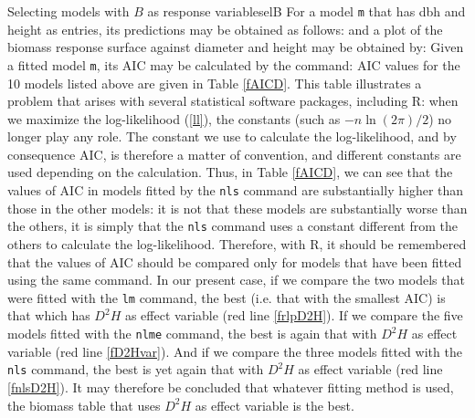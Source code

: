 \begin{filrouge}{Selecting models with $B$ as response variable}{selB}
For a model \texttt{m} that has dbh and height as entries, its predictions may be obtained as follows:
%
and a plot of the biomass response surface against diameter and height may be obtained by:
%
Given a fitted model \texttt{m}, its AIC may be calculated by the command: 
%
AIC values for the 10 models listed above are given in Table \ref{fAICD}. This table illustrates a problem that arises with several statistical software packages, including R: when we maximize the log-likelihood (\ref{ll}), the constants (such as $-n\ln(2\pi)/2$) no longer play any role. The constant we use to calculate the log-likelihood, and by consequence AIC, is therefore a matter of convention, and different constants are used depending on the calculation. Thus, in Table \ref{fAICD}, we can see that the values of AIC in models fitted by the \texttt{nls} command are substantially higher than those in the other models: it is not that these models are substantially worse than the others, it is simply that the \texttt{nls} command uses a constant different from the others to calculate the log-likelihood. Therefore, with R, it should be remembered that the values of AIC should be compared only for models that have been fitted using the same command.
In our present case, if we compare the two models that were fitted with the \texttt{lm} command, the best (i.e. that with the smallest AIC) is that which has $D^2H$ as effect variable (red line \ref{frlpD2H}). If we compare the five models fitted with the \texttt{nlme} command, the best is again that with $D^2H$ as effect variable (red line \ref{fD2Hvar}). And if we compare the three models fitted with the \texttt{nls} command, the best is yet again that with $D^2H$ as effect variable (red line \ref{fnlsD2H}). It may therefore be concluded that whatever fitting method is used, the biomass table that uses $D^2H$ as effect variable is the best.
\end{filrouge}


